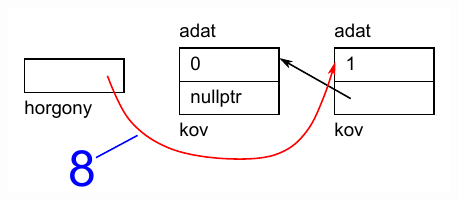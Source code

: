 \begin{frame}
  \begin{columns}[c]
      \begin{exampleblock}{}
        \vspace{-.2cm}
        \small
        
        \vspace{-.2cm}
      \end{exampleblock}
      \includegraphics[width=\textwidth]{verem/verem09.pdf}
  \end{columns}
\end{frame}
